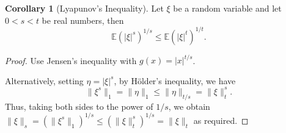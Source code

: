 \documentclass[]{article}
\theoremstyle{definition}
\newtheorem{corollary}{Corollary}[theorem]
\theoremstyle{definition}
\begin{document}
\begin{corollary}[Lyapunov's Inequality]
  Let \(\xi\) be a random variable and let \(0 < s < t\) be real numbers, then 
  \[\mathbb{E}(|\xi|^s)^{1 / s} \le \mathbb{E}(|\xi|^t)^{1 / t}.\]
\end{corollary}
\begin{proof}
  Use Jensen's inequality with \(g(x) = |x|^{t / s}\). 

  Alternatively, setting \(\eta = |\xi|^s\), by Hölder's inequality, we have 
  \[\|\xi^s\|_1 =  \|\eta\|_1 \le \|\eta\|_{t / s} = \|\xi\|^s_t.\]
  Thus, taking both sides to the power of \(1 / s\), we obtain 
  \(\|\xi\|_s = (\|\xi^s\|_1)^{1 / s} \le (\|\xi\|^s_t)^{1 / s} = \|\xi\|_t\) as required.
\end{proof}
\end{document}
